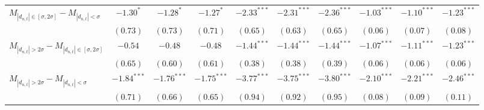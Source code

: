 \begin{tabular}{lccccccccc}
 \hline$M_{|d_{n,t}| \in [\sigma, 2\sigma]} - M_{|d_{n,t}| < \sigma}$ & $-1.30^{*}$ & $-1.28^{*}$ & $-1.27^{*}$ & $-2.33^{***}$ & $-2.31^{***}$ & $-2.36^{***}$ & $-1.03^{***}$ & $-1.10^{***}$ & $-1.23^{***}$ \\ 
   & $(0.73)$ & $(0.73)$ & $(0.71)$ & $(0.65)$ & $(0.63)$ & $(0.65)$ & $(0.06)$ & $(0.07)$ & $(0.08)$ \\ 
  $M_{|d_{n,t}| > 2 \sigma} - M_{|d_{n,t}| \in [\sigma, 2\sigma]}$ & $-0.54$ & $-0.48$ & $-0.48$ & $-1.44^{***}$ & $-1.44^{***}$ & $-1.44^{***}$ & $-1.07^{***}$ & $-1.11^{***}$ & $-1.23^{***}$ \\ 
   & $(0.65)$ & $(0.60)$ & $(0.61)$ & $(0.38)$ & $(0.38)$ & $(0.39)$ & $(0.06)$ & $(0.06)$ & $(0.06)$ \\ 
  $M_{|d_{n,t}| > 2 \sigma} - M_{|d_{n,t}| < \sigma}$ & $-1.84^{***}$ & $-1.76^{***}$ & $-1.75^{***}$ & $-3.77^{***}$ & $-3.75^{***}$ & $-3.80^{***}$ & $-2.10^{***}$ & $-2.21^{***}$ & $-2.46^{***}$ \\ 
   & $(0.71)$ & $(0.66)$ & $(0.65)$ & $(0.94)$ & $(0.92)$ & $(0.95)$ & $(0.08)$ & $(0.09)$ & $(0.11)$ \\ 
   \hline 
\end{tabular}
